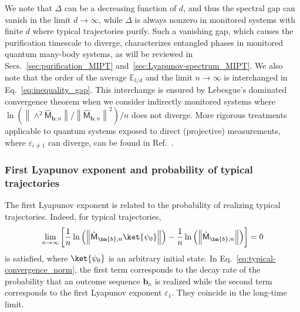 \documentclass[preprint,pteplogo]{ptephy_v2}%
\numberwithin{equation}{section}
\theoremstyle{definition}
\begin{document}
We note that $\Delta$ can be a decreasing function of $d$, and thus the spectral gap can vanish in the limit $d\rightarrow\infty$, while $\Delta$ is always nonzero in monitored systems with finite $d$ where typical trajectories purify. 
Such a vanishing gap, which causes the purification timescale to diverge, characterizes entangled phases in monitored quantum many-body systems, as will be reviewed in Secs.~\ref{sec:purification_MIPT} and~\ref{sec:Lyapunov-spectrum_MIPT}. 
We also note that the order of the average $\mathbb{E}_{\mathbb{I}/d}$ and the limit $n\rightarrow\infty$ is interchanged in Eq.~\eqref{eq:inequality_gap}.
This interchange is ensured by Lebesgue's dominated convergence theorem when we consider indirectly monitored systems where $\ln\left(\left\|\land^2\hat{\mathsf{M}}_{\bm{b};n}\right\|/\left\|\hat{\mathsf{M}}_{\bm{b};n}\right\|^2\right)/n$ does not diverge. 
More rigorous treatments applicable to quantum systems exposed to direct (projective) measurements, where $\varepsilon_{i\neq1}$ can diverge, can be found in Ref.~\cite{benoist2019invariant}. 


\subsubsection{First Lyapunov exponent and probability of typical trajectories}
The first Lyapunov exponent is related to the probability of realizing typical trajectories. 
Indeed, for typical trajectories,
\begin{align}
    \lim_{n\rightarrow\infty}\left[
    \frac{1}{n}\ln\left(\left\|\hat{\mathsf{M}}_{\bm{b};n}\ket{\psi_0}\right\|\right)
    -\frac{1}{n}\ln\left(\left\|\hat{\mathsf{M}}_{\bm{b};n}\right\|\right)\right]=0
    \label{eq:typical-convergence_norm}
\end{align}
is satisfied, where $\ket{\psi_0}$ is an arbitrary initial state. 
In Eq.~\eqref{eq:typical-convergence_norm}, the first term corresponds to the decay rate of the probability that an outcome sequence $\bm{b}_n$ is realized while the second term corresponds to the first Lyapunov exponent $\varepsilon_1$. They coincide in the long-time limit. 
\end{document}
